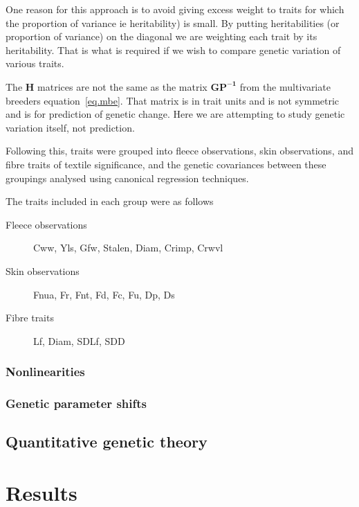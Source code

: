 \documentclass[titlepage]{article}  %
\begin{document}
One reason for this approach is to avoid giving excess weight to traits for which the proportion of variance ie heritability) is small. By putting heritabilities (or proportion of variance) on the diagonal we are weighting each trait by its heritability. That is what is required if we wish to compare genetic variation of various traits.

The $\bm{H}$ matrices are not the same as the matrix $\bm{GP^{-1}}$ from the multivariate breeders equation~\ref{eq.mbe}. That matrix is in trait units and is not symmetric and is for prediction of genetic change. Here we are attempting to study genetic variation itself, not prediction.

 Following this, traits were grouped into fleece observations, skin observations, and fibre traits of textile significance, and the genetic covariances between these groupings analysed using canonical regression techniques.

The traits included in each group were as follows
\begin{description}
\item[Fleece observations] Cww, Yls, Gfw, Stalen, Diam, Crimp, Crwvl
\item[Skin observations] Fnua, Fr, Fnt, Fd, Fc, Fu, Dp, Ds
\item[Fibre traits] Lf, Diam, SDLf, SDD
\end{description}


\subsubsection{Nonlinearities}

\subsubsection{Genetic parameter shifts}

\subsection{Quantitative genetic theory}

\section{Results}
\end{document}
